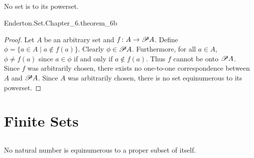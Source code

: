 \documentclass{report}
\begin{document}
\subsection{}%

  \begin{theorem}[6B]
    No set is  to its powerset.
  \end{theorem}

    {Enderton.Set.Chapter\_6.theorem\_6b}

  \begin{proof}
    Let $A$ be an arbitrary set and $f \colon A \rightarrow \mathscr{P}A$.
    Define $\phi = \{a \in A \mid a \not\in f(a)\}$.
    Clearly $\phi \in \mathscr{P}A$.
    Furthermore, for all $a \in A$, $\phi \neq f(a)$ since $a \in \phi$ if and
      only if $a \not\in f(a)$.
    Thus $f$ cannot be onto $\mathscr{P}A$.
    Since $f$ was arbitrarily chosen, there exists no one-to-one correspondence
      between $A$ and $\mathscr{P}A$.
    Since $A$ was arbitrarily chosen, there is no set equinumerous to its
      powerset.
  \end{proof}

\section{Finite Sets}%

\subsection{}%

  \begin{theorem}
    No natural number is equinumerous to a proper subset of itself.
  \end{theorem}
\end{document}
